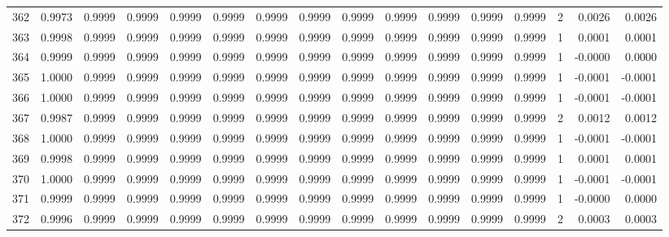 \begin{tabular}{lrrrrrrrrrrrrrrr}
362 &      0.9973 &  0.9999 &  0.9999 &  0.9999 &  0.9999 &  0.9999 &  0.9999 &  0.9999 &  0.9999 &  0.9999 &   0.9999 &     0.9999 &      2 &                    0.0026 &                     0.0026 \\
363 &      0.9998 &  0.9999 &  0.9999 &  0.9999 &  0.9999 &  0.9999 &  0.9999 &  0.9999 &  0.9999 &  0.9999 &   0.9999 &     0.9999 &      1 &                    0.0001 &                     0.0001 \\
364 &      0.9999 &  0.9999 &  0.9999 &  0.9999 &  0.9999 &  0.9999 &  0.9999 &  0.9999 &  0.9999 &  0.9999 &   0.9999 &     0.9999 &      1 &                   -0.0000 &                     0.0000 \\
365 &      1.0000 &  0.9999 &  0.9999 &  0.9999 &  0.9999 &  0.9999 &  0.9999 &  0.9999 &  0.9999 &  0.9999 &   0.9999 &     0.9999 &      1 &                   -0.0001 &                    -0.0001 \\
366 &      1.0000 &  0.9999 &  0.9999 &  0.9999 &  0.9999 &  0.9999 &  0.9999 &  0.9999 &  0.9999 &  0.9999 &   0.9999 &     0.9999 &      1 &                   -0.0001 &                    -0.0001 \\
367 &      0.9987 &  0.9999 &  0.9999 &  0.9999 &  0.9999 &  0.9999 &  0.9999 &  0.9999 &  0.9999 &  0.9999 &   0.9999 &     0.9999 &      2 &                    0.0012 &                     0.0012 \\
368 &      1.0000 &  0.9999 &  0.9999 &  0.9999 &  0.9999 &  0.9999 &  0.9999 &  0.9999 &  0.9999 &  0.9999 &   0.9999 &     0.9999 &      1 &                   -0.0001 &                    -0.0001 \\
369 &      0.9998 &  0.9999 &  0.9999 &  0.9999 &  0.9999 &  0.9999 &  0.9999 &  0.9999 &  0.9999 &  0.9999 &   0.9999 &     0.9999 &      1 &                    0.0001 &                     0.0001 \\
370 &      1.0000 &  0.9999 &  0.9999 &  0.9999 &  0.9999 &  0.9999 &  0.9999 &  0.9999 &  0.9999 &  0.9999 &   0.9999 &     0.9999 &      1 &                   -0.0001 &                    -0.0001 \\
371 &      0.9999 &  0.9999 &  0.9999 &  0.9999 &  0.9999 &  0.9999 &  0.9999 &  0.9999 &  0.9999 &  0.9999 &   0.9999 &     0.9999 &      1 &                   -0.0000 &                     0.0000 \\
372 &      0.9996 &  0.9999 &  0.9999 &  0.9999 &  0.9999 &  0.9999 &  0.9999 &  0.9999 &  0.9999 &  0.9999 &   0.9999 &     0.9999 &      2 &                    0.0003 &                     0.0003 \\

\end{tabular}
